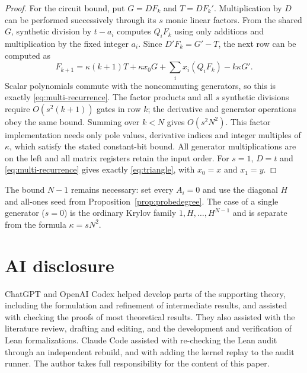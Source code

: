 \documentclass[11pt,letterpaper]{article}
\theoremstyle{definition}\newtheorem{definition}[theorem]{Definition}
\theoremstyle{remark}\newtheorem{remark}[theorem]{Remark}
\begin{document}
\begin{proof}
For the circuit bound, put $G=DF_k$ and $T=DF_k'$. Multiplication by $D$
can be performed successively through its $s$ monic linear factors.
From the shared $G$, synthetic division by $t-a_i$ computes
$Q_iF_k$ using only additions and multiplication by the fixed integer
$a_i$. Since $D'F_k=G'-T$, the next row can be computed as
\[
F_{k+1}=\kappa(k+1)T+\kappa x_0G
             +\sum_i x_i(Q_iF_k)-k\kappa G'.
\]
Scalar polynomials commute with the noncommuting generators, so this is
exactly \eqref{eq:multi-recurrence}. The factor products and all $s$
synthetic divisions require $O(s^2(k+1))$ gates in row $k$; the derivative
and generator operations obey the same bound. Summing over $k<N$ gives
$O(s^2N^2)$. This factor implementation needs only pole values, derivative
indices and integer multiples of $\kappa$, which satisfy the stated
constant-bit bound. All generator multiplications are on the left and
all matrix registers retain the input order. For $s=1$, $D=t$ and
\eqref{eq:multi-recurrence} gives exactly \eqref{eq:triangle}, with
$x_0=x$ and $x_1=y$.
\end{proof}

The bound $N-1$ remains necessary: set every $A_i=0$ and use the diagonal
$H$ and all-ones seed from Proposition~\ref{prop:probedegree}.
The case of a single generator ($s=0$) is the ordinary Krylov family
$1,H,\ldots,H^{N-1}$ and is separate from the formula $\kappa=sN^2$.

\section*{AI disclosure}
ChatGPT and OpenAI Codex helped develop parts of the supporting theory, including the formulation and refinement of intermediate results, and assisted with checking the proofs of most theoretical results. They also assisted with the literature review, drafting and editing, and the development and verification of Lean formalizations. Claude Code assisted with re-checking the Lean audit through an independent rebuild, and with adding the kernel replay to the audit runner. The author takes full responsibility for the content of this paper.
\end{document}
